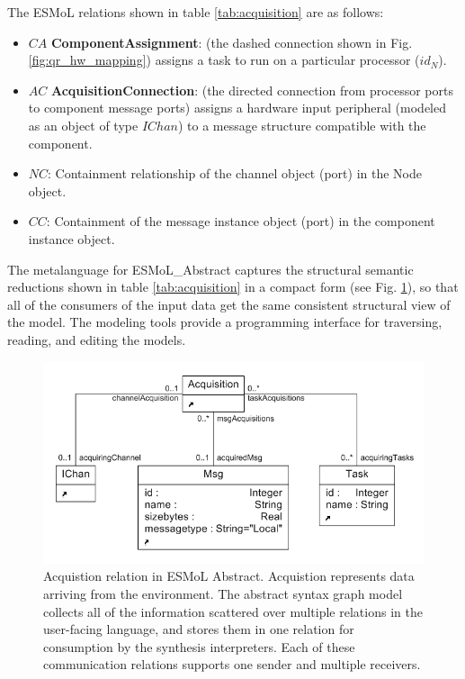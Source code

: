 The ESMoL relations shown in table \ref{tab:acquisition} are as follows:

\begin{itemize}
 \item $CA$ {\bf ComponentAssignment}: (the dashed connection shown in 
Fig. \ref{fig:qr_hw_mapping}) assigns a task to run on a particular 
processor ($id_N$).
 \item $AC$ {\bf AcquisitionConnection}: (the directed connection from 
processor ports to component message ports) assigns a hardware input peripheral
(modeled as an object of type $IChan$) to a message structure compatible with the
component.
 \item $NC$: Containment relationship of the channel object (port) in the Node object.
 \item $CC$: Containment of the message instance object (port) in the component instance object.
\end{itemize}

The metalanguage for ESMoL\_Abstract captures the structural
semantic reductions shown in table \ref{tab:acquisition} in a compact form (see
Fig. \ref{fig:acq_meta}), so that all of the consumers of the input data get the
same consistent structural view of the model.  The modeling tools provide a
programming interface for traversing, reading, and editing the models.

\begin{figure}[htb]
\centering
\includegraphics[width=0.9\columnwidth]{figures/acquisition.png}
    \caption{Acquistion relation in ESMoL Abstract. Acquistion represents
data arriving from the environment. The abstract syntax graph
model collects all of the information scattered over multiple relations in the
user-facing language, and stores them in one relation for consumption by the
synthesis interpreters. Each of these communication relations supports one
sender and multiple receivers. }
    \label{fig:acq_meta}
\end{figure}

